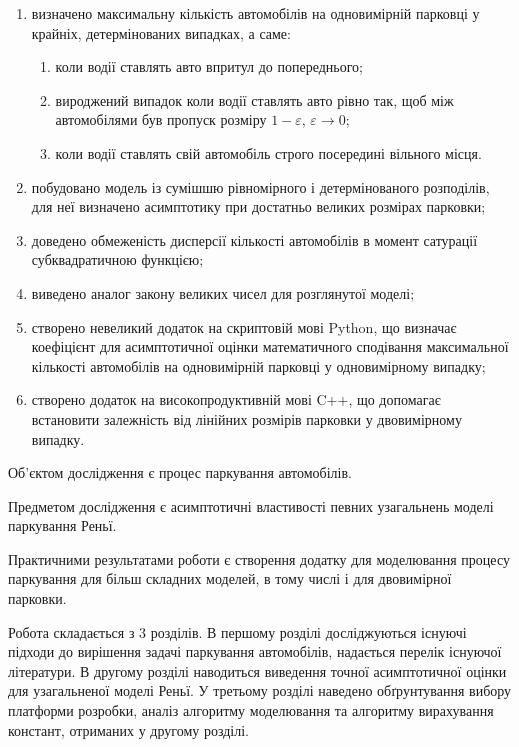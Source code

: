 \begin{enumerate}
	\item визначено максимальну кількість автомобілів на одновимірній парковці у крайніх, детермінованих випадках, а саме:
	\begin{enumerate}
		\item коли водії ставлять авто впритул до попереднього;
		\item вироджений випадок коли водії ставлять авто рівно так, щоб між автомобілями був пропуск розміру $1 - \varepsilon$, $\varepsilon \rightarrow 0$;
		\item коли водії ставлять свій автомобіль строго посередині вільного місця.
	\end{enumerate}
    \item побудовано модель із сумішшю рівномірного і детермінованого розподілів, для неї визначено асимптотику при достатньо великих розмірах парковки;
    \item доведено обмеженість дисперсії кількості автомобілів в момент сатурації субквадратичною функцією;
    \item виведено аналог закону великих чисел для розглянутої моделі;
	\item створено невеликий додаток на скриптовій мові Python, що визначає коефіцієнт для 	асимптотичної оцінки математичного сподівання максимальної кількості автомобілів на 	одновимірній парковці у одновимірному випадку;
    \item створено додаток на високопродуктивній мові C++, що допомагає встановити залежність від лінійних розмірів парковки у двовимірному випадку.
\end{enumerate}

Об'єктом дослідження є процес паркування автомобілів.

Предметом дослідження є асимптотичні властивості певних узагальнень моделі паркування Реньї.

Практичними результатами роботи є створення додатку для моделювання процесу паркування для більш складних моделей, в тому числі і для двовимірної парковки.

Робота складається з 3 розділів. В першому розділі досліджуються існуючі підходи до вирішення задачі паркування автомобілів, надається перелік існуючої літератури. В другому розділі наводиться виведення точної асимптотичної оцінки для узагальненої моделі Реньї. У третьому розділі наведено обґрунтування вибору платформи розробки, аналіз алгоритму моделювання та алгоритму вирахування констант, отриманих у другому розділі.